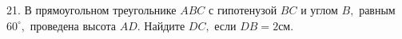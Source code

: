 21. В прямоугольном треугольнике $ABC$ с гипотенузой $BC$ и углом $B,$ равным $60^\circ,$ проведена высота $AD.$ Найдите $DC,$ если $DB=2\text{см}.$\\
